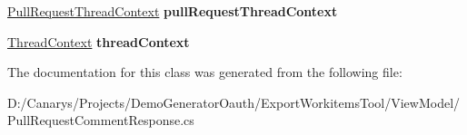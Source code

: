 \begin{DoxyCompactItemize}
\mbox{\hyperlink{class_templates_generator_tool_1_1_view_model_1_1_pull_request_comment_response_1_1_pull_request_thread_context}{Pull\+Request\+Thread\+Context}} {\bfseries pull\+Request\+Thread\+Context}
\item 
\mbox{\label{class_templates_generator_tool_1_1_view_model_1_1_pull_request_comment_response_1_1_value_af952c589230044c1a08855b56e9a0ec5}} 
\mbox{\hyperlink{class_templates_generator_tool_1_1_view_model_1_1_pull_request_comment_response_1_1_thread_context}{Thread\+Context}} {\bfseries thread\+Context}
\end{DoxyCompactItemize}


The documentation for this class was generated from the following file\+:\begin{DoxyCompactItemize}
\item 
D\+:/\+Canarys/\+Projects/\+Demo\+Generator\+Oauth/\+Export\+Workitems\+Tool/\+View\+Model/Pull\+Request\+Comment\+Response.\+cs\end{DoxyCompactItemize}
